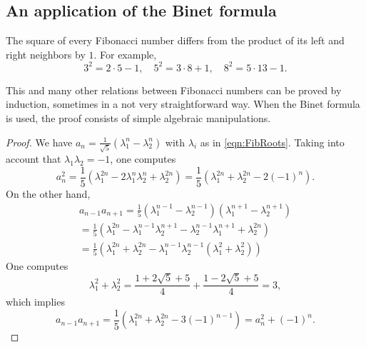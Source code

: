 \begin{page}
\setcounter{section}{1}
\setcounter{subsection}{5}
\setcounter{dfn}{7}
\label{portion:719}

\subsection{An application of the Binet formula}

\end{page}

\begin{page}
\setcounter{section}{1}
\setcounter{subsection}{5}
\setcounter{dfn}{8}
\label{portion:721}

\begin{thm}
The square of every Fibonacci number differs from the product of its left and right neighbors by $1$.
For example,
\[
3^2 = 2 \cdot 5 - 1, \quad 5^2 = 3 \cdot 8 + 1, \quad 8^2 = 5 \cdot 13 - 1.
\]
\end{thm}

\end{page}

\begin{page}
\setcounter{section}{2}
\setcounter{subsection}{0}
\setcounter{dfn}{8}
\label{portion:722}

This and many other relations between Fibonacci numbers can be proved by induction,
sometimes in a not very straightforward way.
When the Binet formula is used, the proof consists of simple algebraic manipulations.

\begin{proof}
We have $a_n = \frac{1}{\sqrt{5}}(\lambda_1^n - \lambda_2^n)$ with $\lambda_i$ as in \eqref{eqn:FibRoots}.
Taking into account that $\lambda_1\lambda_2 = -1$, one computes
\[
a_n^2 = \frac15(\lambda_1^{2n} - 2 \lambda_1^n \lambda_2^n + \lambda_2^{2n}) = \frac15(\lambda_1^{2n} + \lambda_2^{2n} - 2(-1)^n).
\]
On the other hand,
\begin{multline*}
a_{n-1} a_{n+1} = \frac15(\lambda_1^{n-1} - \lambda_2^{n-1})(\lambda_1^{n+1} - \lambda_2^{n+1})\\
= \frac15(\lambda_1^{2n} - \lambda_1^{n-1}\lambda_2^{n+1} - \lambda_2^{n-1}\lambda_1^{n+1} + \lambda_2^{2n})\\
= \frac15(\lambda_1^{2n} + \lambda_2^{2n} - \lambda_1^{n-1}\lambda_2^{n-1}(\lambda_1^2 + \lambda_2^2))
\end{multline*}
One computes
\[
\lambda_1^2 + \lambda_2^2 = \frac{1 + 2\sqrt{5} + 5}4 + \frac{1 - 2\sqrt{5} + 5}4 = 3,
\]
which implies
\[
a_{n-1} a_{n+1} = \frac15(\lambda_1^{2n} + \lambda_2^{2n} - 3(-1)^{n-1}) = a_n^2 + (-1)^n.
\]
\end{proof}





\end{page}

